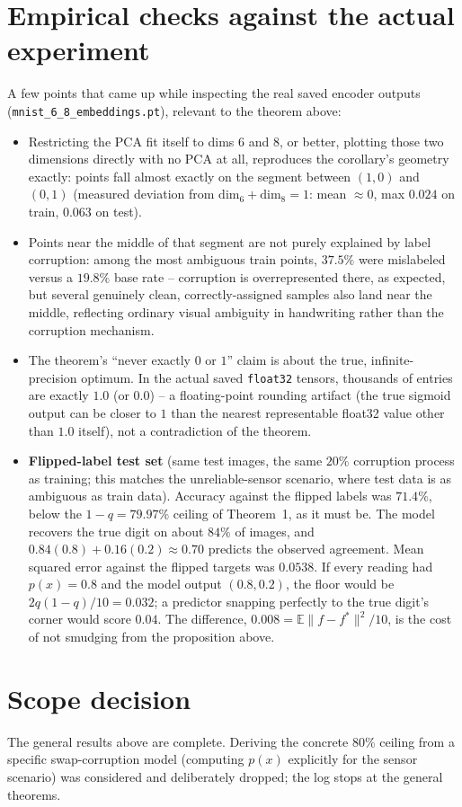 \documentclass[11pt]{article}
\begin{document}
\section{Empirical checks against the actual experiment}

A few points that came up while inspecting the real saved encoder outputs
(\texttt{mnist\_6\_8\_embeddings.pt}), relevant to the theorem above:

\begin{itemize}
  \item Restricting the PCA fit itself to dims 6 and 8, or better, plotting
  those two dimensions directly with no PCA at all, reproduces the
  corollary's geometry exactly: points fall almost exactly on the segment
  between $(1,0)$ and $(0,1)$ (measured deviation from
  $\text{dim}_6+\text{dim}_8=1$: mean $\approx 0$, max $0.024$ on train,
  $0.063$ on test).
  \item Points near the middle of that segment are not purely explained by
  label corruption: among the most ambiguous train points, $37.5\%$ were
  mislabeled versus a $19.8\%$ base rate -- corruption is overrepresented
  there, as expected, but several genuinely clean, correctly-assigned
  samples also land near the middle, reflecting ordinary visual ambiguity
  in handwriting rather than the corruption mechanism.
  \item The theorem's ``never exactly $0$ or $1$'' claim is about the true,
  infinite-precision optimum. In the actual saved \texttt{float32} tensors,
  thousands of entries are exactly $1.0$ (or $0.0$) -- a floating-point
  rounding artifact (the true sigmoid output can be closer to $1$ than the
  nearest representable float32 value other than $1.0$ itself), not a
  contradiction of the theorem.
  \item \textbf{Flipped-label test set} (same test images, the same $20\%$
  corruption process as training; this matches the unreliable-sensor scenario,
  where test data is as ambiguous as train data). Accuracy against the
  flipped labels was $71.4\%$, below the $1-q = 79.97\%$ ceiling of
  Theorem~1, as it must be. The model recovers the true digit on about
  $84\%$ of images, and $0.84(0.8)+0.16(0.2)\approx 0.70$ predicts the
  observed agreement. Mean squared error against the flipped targets was
  $0.0538$. If every reading had $p(x)=0.8$ and the model output
  $(0.8,0.2)$, the floor would be $2q(1-q)/10 = 0.032$; a predictor snapping
  perfectly to the true digit's corner would score $0.04$. The difference,
  $0.008 = \mathbb{E}\|f-f^\ast\|^2/10$, is the cost of not smudging from the
  proposition above.
\end{itemize}

\section{Scope decision}

The general results above are complete. Deriving the concrete $80\%$ ceiling
from a specific swap-corruption model (computing $p(x)$ explicitly for the
sensor scenario) was considered and deliberately dropped; the log stops at the
general theorems.
\end{document}
